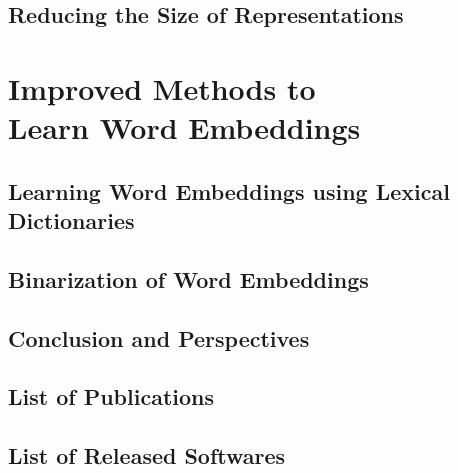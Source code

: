 \documentclass[11pt,twoside]{book}
\theoremstyle{definition}
\begin{document}
      \chapter{Reducing the Size of Representations}
      \label{chap:methods-reduction}
      

    \part[Improved Methods to Learn Word Embeddings] %
         {Improved Methods to \\Learn Word Embeddings}
      \chapter{Learning Word Embeddings using Lexical Dictionaries}
      \label{chap:dict2vec}
      
      \chapter{Binarization of Word Embeddings}
      \label{chap:nlb}
      

    \setcounter{footnote}{0} %
    \chapter*{Conclusion and Perspectives}
    

    \chapter*{List of Publications}
    

    \chapter*{List of Released Softwares}
    \label{chap:software}
    
\end{document}

